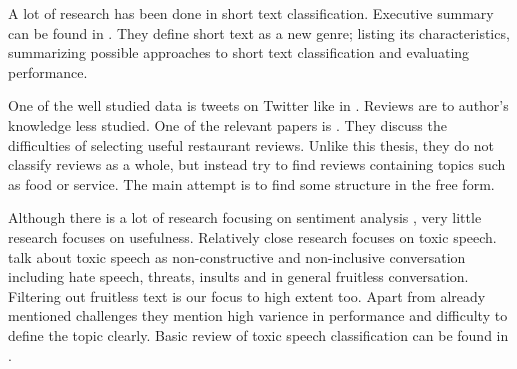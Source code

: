 A lot of research has been done in short text classification.
Executive summary can be found in \citet{Song14}.
They define short text as a new genre; listing its characteristics, summarizing possible approaches to short text classification and evaluating performance.

One of the well studied data is tweets on Twitter like in \citep{sriram2010short}.
Reviews are to author's knowledge less studied.
One of the relevant papers is \citet{ganu2009beyond}.
They discuss the difficulties of selecting useful restaurant reviews.
Unlike this thesis, they do not classify reviews as a whole, but instead try to find reviews containing topics such as food or service.
The main attempt is to find some structure in the free form.

Although there is a lot of research focusing on sentiment analysis ,
very little research focuses on usefulness.
Relatively close research focuses on toxic speech.
\citet{van2018challenges} talk about toxic speech as non-constructive and non-inclusive conversation including hate speech, threats, insults and in general fruitless conversation.
Filtering out fruitless text is our focus to high extent too.
Apart from already mentioned challenges they mention high varience in performance and difficulty to define the topic clearly.
Basic review of toxic speech classification can be found in \citet{gunasekara2018review}.
